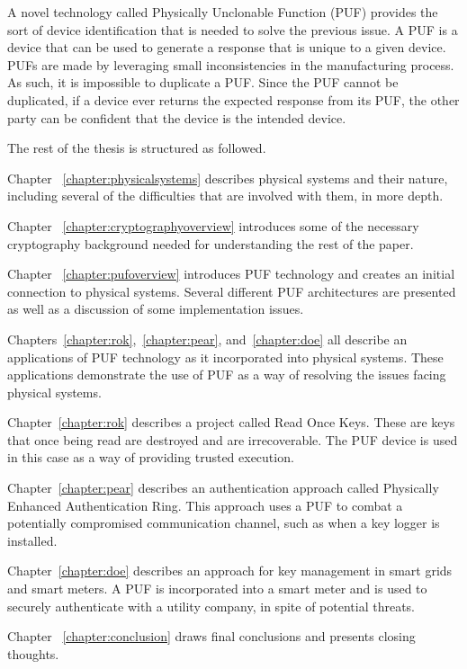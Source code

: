 A novel technology called Physically Unclonable Function (PUF) provides the sort of device identification that is needed
to solve the previous issue. A PUF is a device that can be used to generate a response that is unique to a given device.
PUFs are made by leveraging small inconsistencies in the manufacturing process. As such, it is impossible to
duplicate a PUF. Since the PUF cannot be duplicated, if a device ever returns the expected response from its PUF,
the other party can be confident that the device is the intended device.

The rest of the thesis is structured as followed. 

Chapter ~\ref{chapter:physicalsystems} describes physical systems and their nature, including several of the difficulties that are involved with them, in more depth. 

Chapter ~\ref{chapter:cryptographyoverview} introduces some of the necessary cryptography background needed for
understanding the rest of the paper.

Chapter ~\ref{chapter:pufoverview} introduces PUF technology and creates an initial connection to physical systems. 
Several different PUF architectures are presented as well as a discussion of some implementation issues.

Chapters~\ref{chapter:rok},~\ref{chapter:pear}, and~\ref{chapter:doe} all describe an applications of PUF 
technology as it incorporated into physical systems. These applications demonstrate the use of PUF as a way of 
resolving the issues facing physical systems. 

Chapter~\ref{chapter:rok} describes a project called Read Once Keys. These are keys that once being read are
destroyed and are irrecoverable. The PUF device is used in this case as a way of providing trusted execution.

Chapter~\ref{chapter:pear} describes an authentication approach called Physically Enhanced Authentication Ring. 
This approach uses
a PUF to combat a potentially compromised communication channel, such as when a key logger is installed.

Chapter~\ref{chapter:doe} describes an approach for key management in smart grids and smart meters. A PUF is 
incorporated
into a smart meter and is used to securely authenticate with a utility company, in spite of potential threats.

Chapter ~\ref{chapter:conclusion} draws final conclusions and presents closing thoughts.
